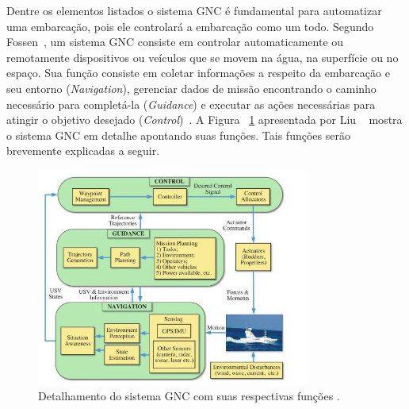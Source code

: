         Dentre os elementos listados o sistema GNC é fundamental para automatizar uma embarcação, pois ele controlará a embarcação como um todo. Segundo Fossen~\cite{Fossen2011Handbook}, um sistema GNC consiste em controlar automaticamente ou remotamente dispositivos ou veículos que se movem na água, na superfície ou no espaço. Sua função consiste em coletar informações a respeito da embarcação e seu entorno (\textit{Navigation}), gerenciar dados de missão encontrando o caminho necessário para completá-la (\textit{Guidance}) e executar as ações necessárias para atingir o objetivo desejado (\textit{Control})~\cite{LIU201671}. A Figura ~\ref{fig:Liu2016_gncSystem} apresentada por Liu \etal~\cite{LIU201671} mostra o sistema GNC em detalhe apontando suas funções. Tais funções serão brevemente explicadas a seguir.
        
        \begin{figure}
            \centering
            \includegraphics[width=0.8\textwidth]{fig/chap2/gnc_system.png}
            \caption{Detalhamento do sistema GNC com suas respectivas funções \cite{LIU201671}.}
            \label{fig:Liu2016_gncSystem}
        \end{figure}
        
